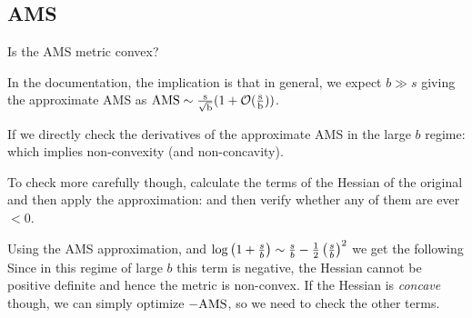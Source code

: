 
\begin{appendices}
\section{AMS}
Is the AMS metric convex?

In the documentation, the implication is that in general, we expect $b \gg s$ giving the approximate AMS as $\rm{AMS} \sim \frac{s}{\sqrt{b}}(1+\mathcal{O}(\frac{s}{b}))$.

If we directly check the derivatives of the approximate AMS in the large $b$ regime:
which implies non-convexity (and non-concavity).

To check more carefully though, calculate the terms of the Hessian of the original and then apply the approximation:
and then verify whether any of them are ever $<0$.

Using the AMS approximation, and $\log\left(1+\frac{s}{b}\right) \sim \frac{s}{b} - \frac{1}{2}\left(\frac{s}{b}\right)^2$ we get the following
Since in this regime of large $b$ this term is negative, the Hessian cannot be positive definite and hence the metric is non-convex. If the Hessian is \emph{concave} though, we can simply optimize $-\rm{AMS}$, so we need to check the other terms.


\end{appendices}
